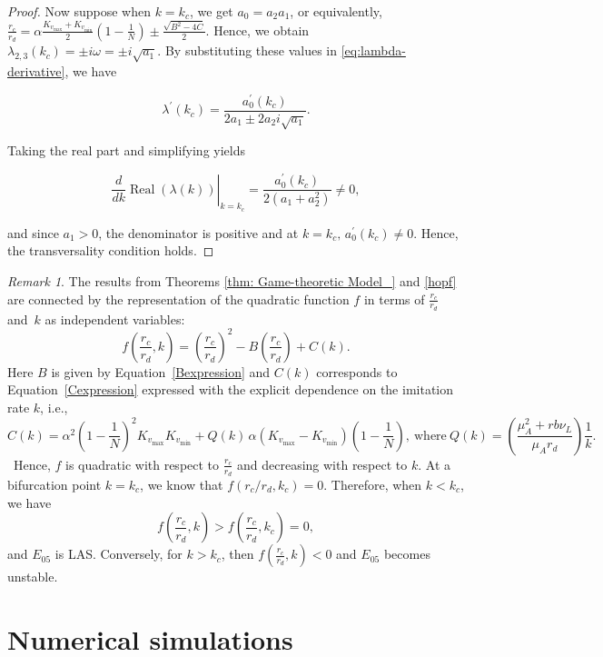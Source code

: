 \documentclass{article}
\theoremstyle{remark}
\newtheorem{remark}{Remark}
\theoremstyle{custom} %
\begin{document}
\begin{proof}
Now suppose when \(k=k_c\), we get  \(a_0=a_2a_1\), or equivalently, \(\frac{r_c}{r_d}
= \alpha \frac{K_{v_{\max}}+K_{v_{\min}}}{2}\left(1-\frac{1}{N}\right) 
\pm \frac{\sqrt{B^2-4C}}{2}\).  Hence, we obtain $\lambda_{2,3}\left(k_c\right)= \pm i \omega= \pm i \sqrt{a_1}.$
By substituting these values in \eqref{eq:lambda-derivative}, we have

$$
\lambda^{\prime}\left(k_c\right)=\frac{a_0^{\prime}\left(k_c\right)}{2 a_1 \pm 2 a_2 i \sqrt{a_1}}.
$$


Taking the real part and simplifying yields


$$
\left.\frac{d}{d k} \operatorname{Real}(\lambda(k))\right|_{k=k_c}=\frac{a_0^{\prime}\left(k_c\right)}{2\left(a_1+a_2^2\right)} \neq 0,
$$


and since $a_1>0$, the denominator is positive and at $k=k_c, \,a_0^{\prime}\left(k_c\right) \neq 0$. Hence, the transversality condition holds.

\end{proof}

\color{black}
\begin{remark}
The results from Theorems \ref{thm: Game-theoretic Model_} and \ref{hopf} are connected by the representation of the quadratic function $f$ 
in terms of $\frac{r_c}{r_d}$ and~$k$ as independent variables:
\[
f\!\left(\frac{r_c}{r_d}, k\right)
= \left(\frac{r_c}{r_d}\right)^2
- B \left(\frac{r_c}{r_d}\right)
+ C(k).
\]
Here $B$ is given by Equation~\ref{Bexpression} and $C(k)$ corresponds to Equation~\eqref{Cexpression} expressed with the explicit dependence on the imitation rate $k$, i.e.,
\[
C(k)
= \alpha^2\!\left(1-\frac{1}{N}\right)^{\!2} K_{v_{\max}} K_{v_{\min}}
+ Q(k)\,\alpha\!\left(K_{v_{\max}} - K_{v_{\min}}\right)\!\left(1-\frac{1}{N}\right),
\ \text{where} \  
Q(k)
= \left(\frac{\mu_A^2 + r b \nu_L}{ \mu_A r_d} \right) \frac{1}{k}.
\]
\
Hence, $f$ is quadratic with respect to $\frac{r_c}{r_d}$ and decreasing with respect to $k$. At a bifurcation point $k = k_c$, we know that $f(r_c/r_d, k_c) = 0$. Therefore, when $k < k_c$, we have
\[
f\!\left(\frac{r_c}{r_d}, k\right)
> f\!\left(\frac{r_c}{r_d}, k_c\right) = 0,
\]
and $E_{05}$ is LAS. Conversely, for $k > k_c$, then $f\!\left(\frac{r_c}{r_d}, k\right)
< 0$ and $E_{05}$ becomes unstable.
\end{remark} 


\color{black}


\section{Numerical simulations} 
\label{numerics}
\end{document}
